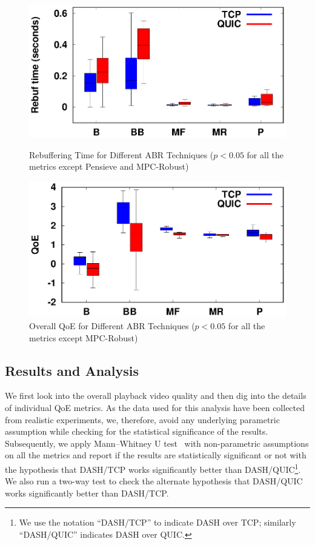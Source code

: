 \begin{figure}[!t]
	\begin{minipage}[t]{0.48\linewidth}
		\includegraphics[width=\linewidth]{img/newexp/rebuf_box}
		\caption{\label{fig:chap03s2:RebufferTime_n}Rebuffering Time for Different ABR Techniques ($p<0.05$ for all the metrics except Pensieve and MPC-Robust)}
	\end{minipage}\hfill
	\begin{minipage}[t]{0.48\linewidth}
		\includegraphics[width=\linewidth]{img/newexp/qoe_box}
		\caption{\label{fig:chap03s2:QOE_n}Overall QoE for Different ABR Techniques ($p<0.05$ for all the metrics except MPC-Robust)}
	\end{minipage}
\end{figure}

\subsection{Results and Analysis}
We first look into the overall playback video quality and then dig into the details of individual \ac{QoE} metrics. As the data used for this analysis have been collected from realistic experiments, we, therefore, avoid any underlying parametric assumption while checking for the statistical significance of the results. Subsequently, we apply Mann–Whitney U test~\cite{mannwhitney} with non-parametric assumptions on all the metrics and report if the results are statistically significant or not with the hypothesis that DASH/TCP works significantly better than DASH/QUIC\footnote{We use the notation ``DASH/TCP'' to indicate \ac{DASH} over \ac{TCP}; similarly ``DASH/QUIC'' indicates \ac{DASH} over \ac{QUIC}.}. We also run a two-way test to check the alternate hypothesis that DASH/QUIC works significantly better than DASH/TCP.




